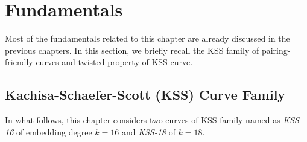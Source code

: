 %
%

\section{Fundamentals}
Most of the fundamentals related to this chapter are already discussed in the previous chapters.
In this section, we briefly recall the KSS family of pairing-friendly curves and twisted property of KSS curve.

\subsection{Kachisa-Schaefer-Scott (KSS) Curve Family}
In what follows, this chapter considers two curves of KSS family named as \textit{KSS-16} of embedding degree $k =16$  and \textit{KSS-18} of $k=18$. 

